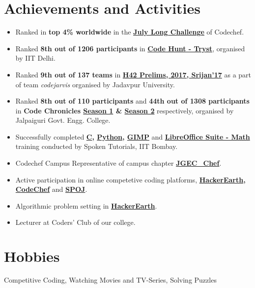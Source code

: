 \documentclass[margin, centered]{res}
\begin{document}
\begin{resume}
\begin{itemize}[leftmargin=*]
\end{itemize}


\section{Achievements and Activities}
\begin{itemize}[leftmargin=*]
	\item
	Ranked in \textbf{top 4\% worldwide} in the \textbf{\href{https://www.codechef.com/JULY17}{July Long Challenge}} of Codechef.
	\item
	Ranked \textbf{8th out of 1206 participants} in \textbf{\href{https://www.hackerearth.com/challenge/college/code-hunt-tryst/leaderboard/}{Code Hunt - Tryst}}, organised by IIT Delhi.
	\item
	Ranked \textbf{9th out of 137 teams} in \textbf{\href{https://www.hackerrank.com/contests/h42-prelims-srijan17/leaderboard}{H42 Prelims, 2017, Srijan'17}} as a part of team \emph{codejarvis} organised by Jadavpur University.
	\item
	Ranked \textbf{8th out of 110 participants} and \textbf{44th out of 1308 participants} in \textbf{Code Chronicles \href{https://www.hackerearth.com/challenge/college/cc1/leaderboard/}{Season 1} \& \href{https://www.hackerearth.com/challenge/college/cc2/leaderboard/}{Season 2}} respectively, organised by Jalpaiguri Govt. Engg. College.
	\item
	Successfully completed \textbf{\href{https://goo.gl/NxdY6T}{C}, \href{https://goo.gl/mLoMF3}{Python}, \href{https://goo.gl/rQg0Dz}{GIMP}} and \textbf{\href{https://goo.gl/i67WIz}{LibreOffice Suite - Math}} training conducted by Spoken Tutorials, IIT Bombay.
	\item
	Codechef Campus Representative of campus chapter \textbf{\href{https://www.codechef.com/campus_chapter/JGEC_Chef}{JGEC\_Chef}}.
	\item
	Active participation in online competetive coding platforms, \textbf{\href{https://www.hackerearth.com/@abhisek17}{HackerEarth}, \href{https://www.codechef.com/users/abhisek_ch}{CodeChef}} and \textbf{\href{http://www.spoj.com/users/abhisekssp4025/}{SPOJ}}.
	\item
	Algorithmic problem setting in \textbf{\href{https://hackerearth.com}{HackerEarth}}.
	\item
	Lecturer at Coders' Club of our college.
\end{itemize}

\section{Hobbies}
Competitive Coding, Watching Movies and TV-Series, Solving Puzzles
\end{resume}
\end{document}
